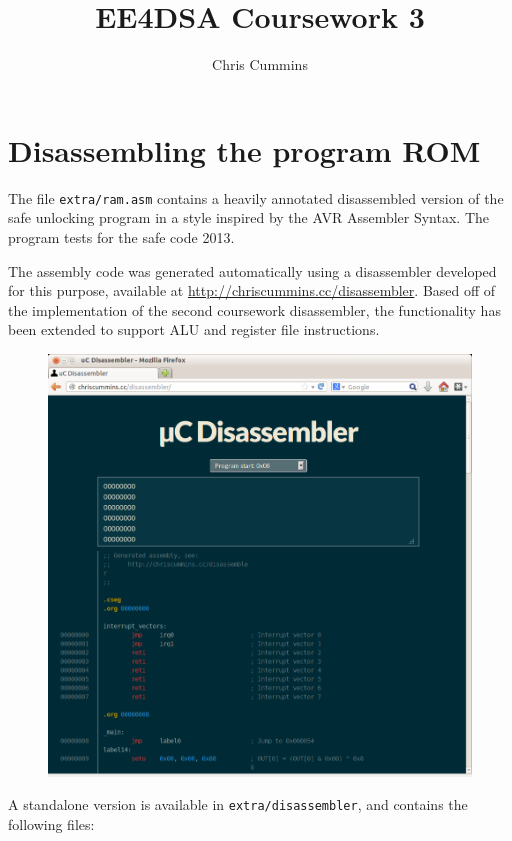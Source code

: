 \documentclass[12pt,a4paper]{article}
\title{EE4DSA Coursework 3}
\author{Chris Cummins}
\begin{document}
\maketitle

\section{Disassembling the program ROM}

The file \texttt{extra/ram.asm} contains a heavily annotated
disassembled version of the safe unlocking program in a style inspired
by the AVR Assembler Syntax. The program tests for the safe code 2013.

The assembly code was generated automatically using a disassembler
developed for this purpose, available at
\url{http://chriscummins.cc/disassembler}. Based off of the
implementation of the second coursework disassembler, the
functionality has been extended to support ALU and register file
instructions.

\begin{figure}[H]
  \centering
  \includegraphics[width=6.7in]{assets/disassembler.png}
\end{figure}

A standalone version is available in \texttt{extra/disassembler}, and
contains the following files:
\end{document}
